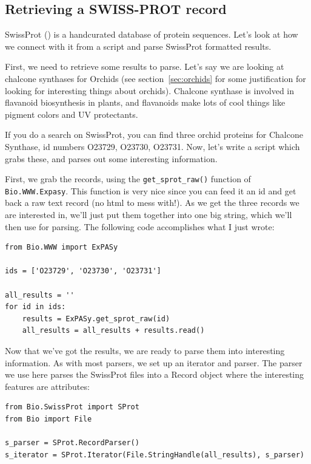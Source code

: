 \documentclass{report}
\begin{document}
\subsection{Retrieving a SWISS-PROT record}

SwissProt () is a handcurated database of protein sequences. Let's look at how we connect with it from a script and parse SwissProt formatted results. 


First, we need to retrieve some results to parse. Let's say we are looking at chalcone synthases for Orchids (see section~\ref{sec:orchids} for some justification for looking for interesting things about orchids). Chalcone synthase is involved in flavanoid biosynthesis in plants, and flavanoids make lots of cool things like pigment colors and UV protectants. 


If you do a search on SwissProt, you can find three orchid proteins for Chalcone Synthase, id numbers O23729, O23730, O23731. Now, let's write a script which grabs these, and parses out some interesting information.


First, we grab the records, using the \verb|get_sprot_raw()| function of \verb|Bio.WWW.Expasy|. This function is very nice since you can feed it an id and get back a raw text record (no html to mess with!). As we get the three records we are interested in, we'll just put them together into one big string, which we'll then use for parsing. The following code accomplishes what I just wrote:

\begin{verbatim}
from Bio.WWW import ExPASy

ids = ['O23729', 'O23730', 'O23731']

all_results = ''
for id in ids:
    results = ExPASy.get_sprot_raw(id)
    all_results = all_results + results.read()
\end{verbatim}

Now that we've got the results, we are ready to parse them into interesting information. As with most parsers, we set up an iterator and parser. The parser we use here parses the SwissProt files into a Record object where the interesting features are attributes:

\begin{verbatim}
from Bio.SwissProt import SProt
from Bio import File

s_parser = SProt.RecordParser()
s_iterator = SProt.Iterator(File.StringHandle(all_results), s_parser)
\end{verbatim}
\end{document}
